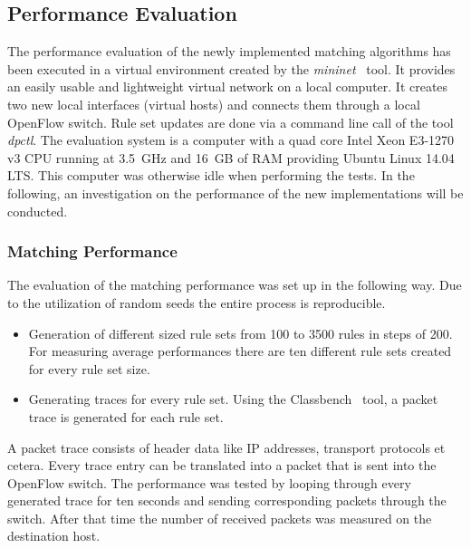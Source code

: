 \documentclass[conference]{IEEEtran}
\begin{document}
\subsection{Performance Evaluation}
The performance evaluation of the newly implemented matching algorithms has 
been executed in a virtual environment created by the \textit{mininet}~\cite{mininet} tool.
It provides an easily usable and lightweight virtual network on a local computer.
It creates two new local interfaces (virtual hosts) and connects them through 
a local OpenFlow switch.
Rule set updates are done via a command line call of the tool \textit{dpctl}.
The evaluation system is a computer with a quad core Intel Xeon E3-1270 v3 CPU 
running at 3.5\ GHz and 16\ GB of RAM providing Ubuntu Linux 14.04 LTS.
This computer was otherwise idle when performing the tests.
In the following, an investigation on the performance of the new implementations will be conducted.

\subsubsection{Matching Performance}
The evaluation of the matching performance was set up in the following way.
Due to the utilization of random seeds the entire process is reproducible.
\begin{itemize}
    \item Generation of different sized rule sets from 100 to 3500 rules in steps of 200.
        For measuring average performances there are ten different rule sets created for every rule set size.
    \item Generating traces for every rule set.
        Using the Classbench~\cite{classbench_website} tool, a packet trace is generated for each rule set.
\end{itemize}

A packet trace consists of header data like IP addresses, transport protocols et cetera.
Every trace entry can be translated into a packet that is sent into the OpenFlow switch.
The performance was tested by looping through every generated trace for ten seconds and sending corresponding packets through the switch.
After that time the number of received packets was measured on the destination host.
\end{document}
